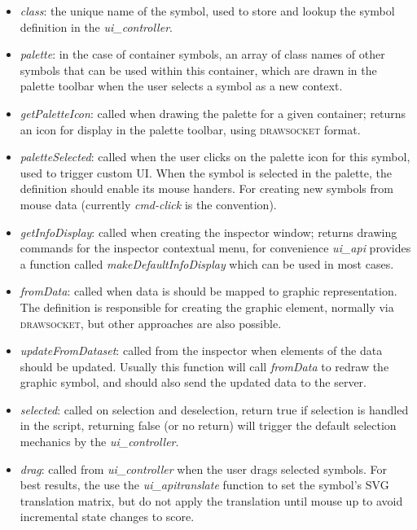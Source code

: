 \documentclass{article}
\def\drawsocket{\textsc{drawsocket}\xspace}
\def\uicontroller{\textit{ui\_controller}\xspace}
\def\uiapi{\textit{ui\_api}\xspace}
\begin{document}
\begin{itemize}\itemsep0pt 
\item \textit{class}: the unique name of the symbol, used to store and lookup the symbol definition in the \uicontroller.

\item \textit{palette}: in the case of container symbols, an array of class names of other symbols that can be used within this container, which are drawn in the palette toolbar when the user selects a symbol as a new context.

\item \textit{getPaletteIcon}: called when drawing the palette for a given container; returns an icon for display in the palette toolbar, using \drawsocket format.

\item \textit{paletteSelected}: called when the user clicks on the palette icon for this symbol, used to trigger custom UI. When the symbol is selected in the palette, the definition should enable its mouse handers. For creating new symbols from mouse data (currently \textit{cmd-click} is the convention).

\item \textit{getInfoDisplay}: called when creating the inspector window; returns drawing commands for the inspector contextual menu, for convenience \uiapi provides a function called \textit{makeDefaultInfoDisplay} which can be used in most cases.

\item \textit{fromData}: called when data is should be mapped to graphic representation. The definition is responsible for creating the graphic element, normally via \drawsocket, but other approaches are also possible.

\item \textit{updateFromDataset}: called from the inspector when elements of the data should be updated. Usually this function will call \textit{fromData} to redraw the graphic symbol, and should also send the updated data to the server.

\item \textit{selected}: called on selection and deselection, return true if selection is handled in the script, returning false (or no return) will trigger the default selection mechanics by the \uicontroller.

\item \textit{drag}: called from \uicontroller when the user drags selected symbols. For best results, the use the \uiapi \textit{translate} function to set the symbol's SVG translation matrix, but do not apply the translation until mouse up to avoid incremental state changes to score.


\end{itemize}
\end{document}
